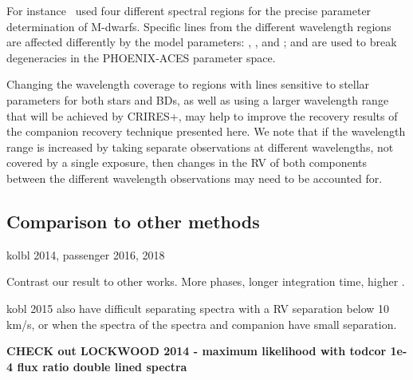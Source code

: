 For instance~\citet{passegger_fundamental_2016} used four different spectral regions for the precise parameter determination of M-dwarfs.
Specific lines from the different wavelength regions are affected differently by the model parameters: \Teff{}, \logg{}, and \feh{}; and are used to break degeneracies in the {PHOENIX-ACES} parameter space.

Changing the wavelength coverage to regions with lines sensitive to stellar parameters for both stars and {BD}s, as well as using a larger wavelength range that will be achieved by {CRIRES+}, may help to improve the recovery results of the companion recovery technique presented here.
We note that if the wavelength range is increased by taking separate observations at different wavelengths, not covered by a single exposure, then changes in the {RV} of both components between the different wavelength observations may need to be accounted for.



\subsection{Comparison to other methods}
kolbl 2014, passenger 2016, 2018

Contrast our result to other works.
More phases, longer integration time, higher {\snr{}}.



kobl 2015 also have difficult separating spectra with a {RV} separation below 10 km/s, or when the spectra of the spectra and companion have small separation.\todo{}


\textbf{
    CHECK out LOCKWOOD 2014 - maximum likelihood with todcor 1e-4 flux ratio double lined spectra}

